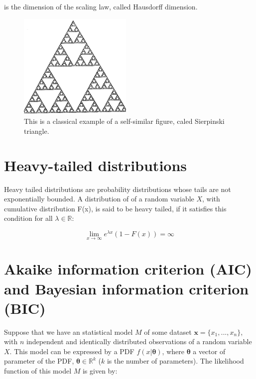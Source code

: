 is the dimension of the scaling law, called  Hausdorff dimension\cite{web-self-similar}. 


\begin{figure}[ht!]
	\centering
	\includegraphics[height=2.0in]{figures/apA/tritrans}
	\caption{This is a classical example of a self-similar figure, caled Sierpinski triangle.}
	\label{fig:self-similar-figure-example}
\end{figure}


\section{Heavy-tailed distributions}

Heavy tailed distributions are probability distributions whose tails are not exponentially bounded.  A distribution of of a random variable $X$, with cumulative distribution F(x), is said to be heavy tailed, if it satisfies this condition for all $\lambda \in \mathbb{R}$:

\begin{equation}
	\lim_{x\to\infty} e^{\lambda x} (1 - F(x)) = \infty
\end{equation}


\section{Akaike information criterion (AIC) and Bayesian information criterion (BIC)}

Suppose that we have an statistical model $M$ of some dataset ${\boldsymbol{x} = \{x_1, ..., x_n}\}$, with $n$ independent and identically distributed observations of a random variable $X$. This model can be expressed by a PDF $f(x| \boldsymbol{\theta})$, where $\boldsymbol{\theta}$ a vector of parameter of the PDF, $\boldsymbol{\theta} \in \mathbb{R}^{k}$ ($k$ is the number of parameters). The  likelihood function  of this model $M$ is given by:

